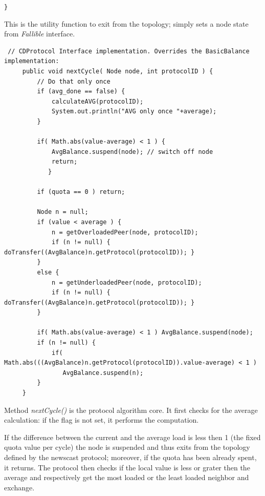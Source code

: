\documentclass[a4paper,11pt]{article}
\begin{document}
\texttt{\footnotesize \}}{\footnotesize \par}

This is the utility function to exit from the topology; simply sets
a node state from \emph{Fallible} interface.\\

\footnotesize
\begin{verbatim}
 // CDProtocol Interface implementation. Overrides the BasicBalance implementation:
     public void nextCycle( Node node, int protocolID ) {
         // Do that only once
         if (avg_done == false) {
             calculateAVG(protocolID);
             System.out.println("AVG only once "+average);
         }
    
         if( Math.abs(value-average) < 1 ) {
             AvgBalance.suspend(node); // switch off node
             return;
            }
     
         if (quota == 0 ) return;
     
         Node n = null;
         if (value < average ) {
             n = getOverloadedPeer(node, protocolID);
             if (n != null) { doTransfer((AvgBalance)n.getProtocol(protocolID)); } 
         }
         else {
             n = getUnderloadedPeer(node, protocolID);
             if (n != null) { doTransfer((AvgBalance)n.getProtocol(protocolID)); } 
         } 
     
         if( Math.abs(value-average) < 1 ) AvgBalance.suspend(node);
         if (n != null) {
             if( Math.abs(((AvgBalance)n.getProtocol(protocolID)).value-average) < 1 ) 
	            AvgBalance.suspend(n);
         }
     }
\end{verbatim}
\normalsize

Method \emph{nextCycle()} is the protocol algorithm core. It first
checks for the average calculation: if the flag is not set, it performs
the computation.

If the difference between the current and the average load is less
then 1 (the fixed quota value per cycle) the node is suspended and
thus exits from the topology defined by the newscast protocol; moreover,
if the quota has been already spent, it returns. The protocol then
checks if the local value is less or grater then the average and respectively
get the most loaded or the least loaded neighbor and exchange.\\
\end{document}
